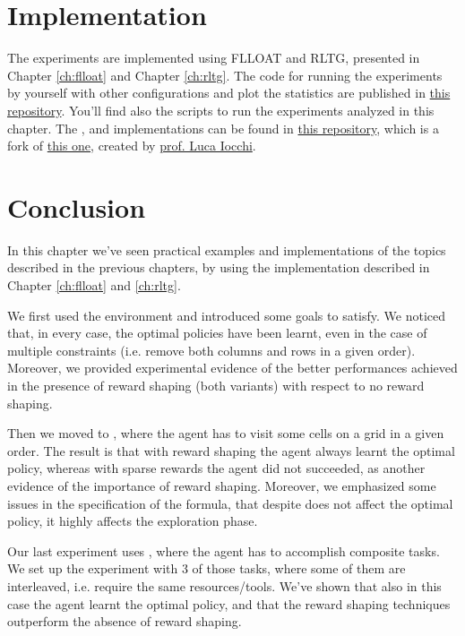 \section{Implementation}
The experiments are implemented using FLLOAT and RLTG, presented in Chapter \ref{ch:flloat} and Chapter \ref{ch:rltg}.
The code for running the experiments by yourself with other configurations and plot the statistics are published in \href{https://github.com/MarcoFavorito/rltg-examples}{this repository}. You'll find also the scripts to run the experiments analyzed in this chapter. The \Breakout, \Sapientino and \Minecraft implementations can be found in \href{https://github.com/MarcoFavorito/RLgames}{this repository}, which is a fork of \href{https://github.com/iocchi/RLgames}{this one}, created by \href{https://sites.google.com/a/dis.uniroma1.it/iocchi/home}{prof. Luca Iocchi}.

\section{Conclusion}
In this chapter we've seen practical examples and implementations of the topics described in the previous chapters, by using the implementation described in Chapter \ref{ch:flloat} and \ref{ch:rltg}. 

We first used the \Breakout environment and introduced some \LLf goals to satisfy. We noticed that, in every case, the optimal policies have been learnt, even in the case of multiple constraints (i.e. remove  both columns and rows in a given order). Moreover, we provided experimental evidence of the better performances achieved in the presence of reward shaping (both variants) with respect to no reward shaping.

Then we moved to \Sapientino, where the agent has to visit some cells on a grid in a given order. The result is that with reward shaping the agent always learnt the optimal policy, whereas with sparse rewards the agent did not succeeded, as another evidence of the importance of reward shaping. Moreover, we emphasized some issues in the specification of the formula, that despite does not affect the optimal policy, it highly affects the exploration phase.

Our last experiment uses \Minecraft, where the agent has to accomplish composite tasks. We set up the experiment with 3 of those tasks, where some of them are interleaved, i.e. require the same resources/tools. We've shown that also in this case the agent learnt the optimal policy, and that the reward shaping techniques outperform the absence of reward shaping.